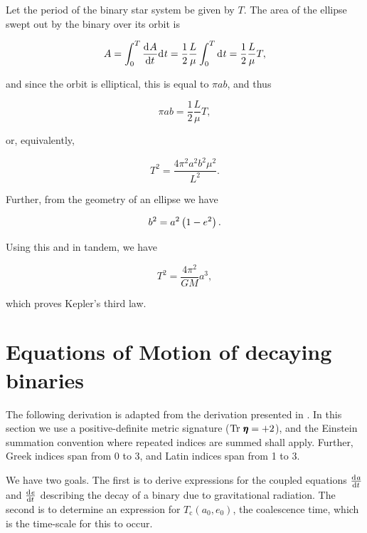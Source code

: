 Let the period of the binary star system be given by $T$. The area of the ellipse swept out by the binary over its orbit is

\begin{equation}
    A = \int_0^T \dv{A}{t} \dd{t} = \frac12 \frac{L}{\mu}\int_0^T \dd{t} = \frac12 \frac{L}{\mu} T,
\end{equation}

and since the orbit is elliptical, this is equal to $\pi ab$, and thus

\begin{equation}
    \pi ab = \frac12 \frac{L}{\mu} T,
\end{equation}

or, equivalently,

\begin{equation}
    T^2 = \frac{4\pi^2a^2b^2\mu^2}{L^2}.
\end{equation}

Further, from the geometry of an ellipse we have

\begin{equation}
    b^2 = a^2\left(1-e^2\right).
\end{equation}

Using this and  in tandem, we have

\begin{tcolorbox}[enhanced,title={Kepler's Third Law}]
    \begin{equation}
        T^2 = \frac{4\pi^2}{GM} a^3,
    \end{equation}
\end{tcolorbox}

which proves Kepler's third law.

\section{Equations of Motion of decaying binaries}\label{sec:equations_of_motion_of_decaying_binaries}

The following derivation is adapted from the derivation presented in \citet{Richards:2021}. In this section we use a positive-definite metric signature ($\mathrm{Tr}~\pmb{\mathsf{\eta}}=+2$), and the Einstein summation convention where repeated indices are summed shall apply. Further, Greek indices span from 0 to 3, and Latin indices span from 1 to 3.

We have two goals. The first is to derive expressions for the coupled equations $\dv{a}{t}$ and $\dv{e}{t}$ describing the decay of a binary due to gravitational radiation. The second is to determine an expression for $T_\text{c}(a_0, e_0)$, the coalescence time, which is the time-scale for this to occur.

